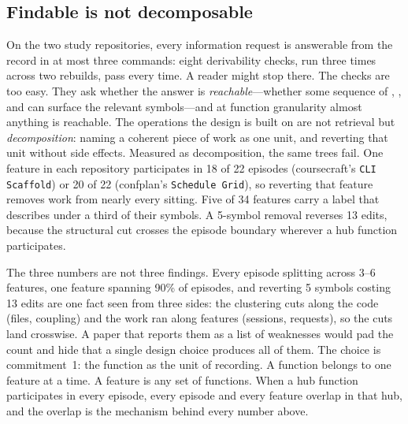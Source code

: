 \subsection{Findable is not decomposable}
\label{sec:findable-not-decomposable}

On the two study repositories, every information request is answerable from the
\sgt{} record in at most three commands: eight derivability checks, run three
times across two rebuilds, pass every time. A reader might stop there. The checks
are too easy. They ask whether the answer is \emph{reachable}---whether some
sequence of , , and  can surface the
relevant symbols---and at function granularity almost anything is reachable. The
operations the design is built on are not retrieval but \emph{decomposition}:
naming a coherent piece of work as one unit, and reverting that unit without side
effects. Measured as decomposition, the same trees fail. One feature in each
repository participates in 18 of 22 episodes (coursecraft's \texttt{CLI Scaffold})
or 20 of 22 (confplan's \texttt{Schedule Grid}), so reverting that feature removes
work from nearly every sitting. Five of 34 features carry a label that describes
under a third of their symbols. A 5-symbol removal reverses 13 edits, because the
structural cut crosses the episode boundary wherever a hub function participates.

The three numbers are not three findings. Every episode splitting across 3--6
features, one feature spanning 90\% of episodes, and reverting 5 symbols costing
13 edits are one fact seen from three sides: the clustering cuts along the code
(files, coupling) and the work ran along features (sessions, requests), so the cuts
land crosswise. A paper that reports them as a list of weaknesses would pad the
count and hide that a single design choice produces all of them. The choice is
commitment~1: the function as the unit of recording. A function belongs to one
feature at a time. A feature is any set of functions. When a hub function
participates in every episode, every episode and every feature overlap in that hub,
and the overlap is the mechanism behind every number above.

